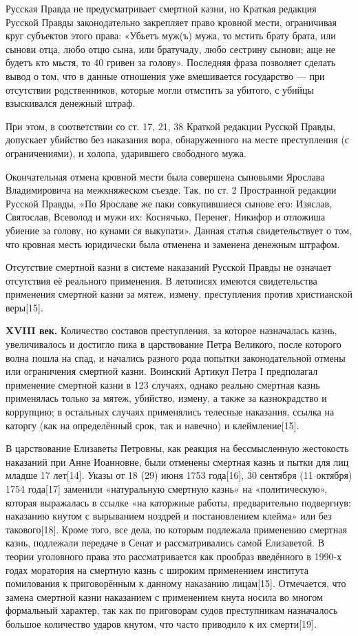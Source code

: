 Русская Правда не предусматривает смертной казни, но Краткая редакция Русской Правды законодательно закрепляет право кровной мести, ограничивая круг субъектов этого права: «Убьетъ муж(ъ) мужа, то мстить брату брата, или сынови отца, любо отцю сына, или братучаду, любо сестрину сынови; аще не будетъ кто мьстя, то 40 гривен за голову». Последняя фраза позволяет сделать вывод о том, что в данные отношения уже вмешивается государство — при отсутствии родственников, которые могли отмстить за убитого, с убийцы взыскивался денежный штраф.

При этом, в соответствии со ст. 17, 21, 38 Краткой редакции Русской Правды, допускает убийство без наказания вора, обнаруженного на месте преступления (с ограничениями), и холопа, ударившего свободного мужа.

Окончательная отмена кровной мести была совершена сыновьями Ярослава Владимировича на межкняжеском съезде. Так, по ст. 2 Пространной редакции Русской Правды, «По Ярославе же паки совкупившиеся сынове его: Изяслав, Святослав, Всеволод и мужи их: Коснячько, Перенег, Никифор и отложиша убиение за голову, но кунами ся выкупати». Данная статья свидетельствует о том, что кровная месть юридически была отменена и заменена денежным штрафом.

Отсутствие смертной казни в системе наказаний Русской Правды не означает отсутствия её реального применения. В летописях имеются свидетельства применения смертной казни за мятеж, измену, преступления против христианской веры[15].

\textbf{XVIII век.} Количество составов преступления, за которое назначалась казнь, увеличивалось и достигло пика в царствование Петра Великого, после которого волна пошла на спад, и начались разного рода попытки законодательной отмены или ограничения смертной казни. Воинский Артикул Петра I предполагал применение смертной казни в 123 случаях, однако реально смертная казнь применялась только за мятеж, убийство, измену, а также за казнокрадство и коррупцию; в остальных случаях применялись телесные наказания, ссылка на каторгу (как на определённый срок, так и навечно) и клеймление[15].

В царствование Елизаветы Петровны, как реакция на бессмысленную жестокость наказаний при Анне Иоанновне, были отменены смертная казнь и пытки для лиц младше 17 лет[14]. Указы от 18 (29) июня 1753 года[16], 30 сентября (11 октября) 1754 года[17] заменили «натуральную смертную казнь» на «политическую», которая выражалась в ссылке «на каторжные работы, предварительно подвергнув: наказанию кнутом с вырыванием ноздрей и постановлением клейма» или без такового[18]. Кроме того, все дела, по которым подлежала применению смертная казнь, подлежали передаче в Сенат и рассматривались самой Елизаветой. В теории уголовного права это рассматривается как прообраз введённого в 1990-х годах моратория на смертную казнь с широким применением института помилования к приговорённым к данному наказанию лицам[15]. Отмечается, что замена смертной казни наказанием с применением кнута носила во многом формальный характер, так как по приговорам судов преступникам назначалось большое количество ударов кнутом, что часто приводило к их смерти[19].

